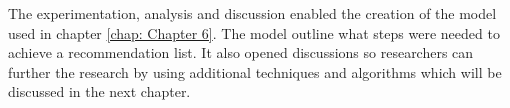 The experimentation, analysis and discussion enabled the creation of the model used in chapter \ref{chap: Chapter 6}. The model outline what steps were needed to achieve a recommendation list. It also opened discussions so researchers can further the research by using additional techniques and algorithms which will be discussed in the next chapter.